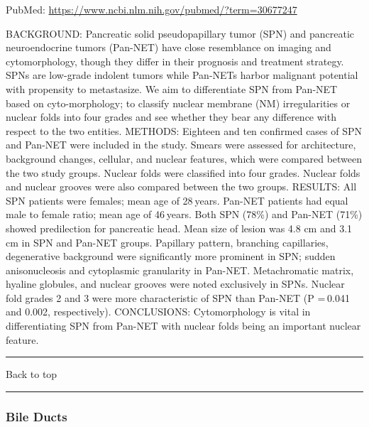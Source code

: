 \documentclass[]{article}
\begin{document}
PubMed: \url{https://www.ncbi.nlm.nih.gov/pubmed/?term=30677247}

BACKGROUND: Pancreatic solid pseudopapillary tumor (SPN) and pancreatic
neuroendocrine tumors (Pan-NET) have close resemblance on imaging and
cytomorphology, though they differ in their prognosis and treatment
strategy. SPNs are low-grade indolent tumors while Pan-NETs harbor
malignant potential with propensity to metastasize. We aim to
differentiate SPN from Pan-NET based on cyto-morphology; to classify
nuclear membrane (NM) irregularities or nuclear folds into four grades
and see whether they bear any difference with respect to the two
entities. METHODS: Eighteen and ten confirmed cases of SPN and Pan-NET
were included in the study. Smears were assessed for architecture,
background changes, cellular, and nuclear features, which were compared
between the two study groups. Nuclear folds were classified into four
grades. Nuclear folds and nuclear grooves were also compared between the
two groups. RESULTS: All SPN patients were females; mean age of
28 years. Pan-NET patients had equal male to female ratio; mean age of
46 years. Both SPN (78\%) and Pan-NET (71\%) showed predilection for
pancreatic head. Mean size of lesion was 4.8 cm and 3.1 cm in SPN and
Pan-NET groups. Papillary pattern, branching capillaries, degenerative
background were significantly more prominent in SPN; sudden
anisonucleosis and cytoplasmic granularity in Pan-NET. Metachromatic
matrix, hyaline globules, and nuclear grooves were noted exclusively in
SPNs. Nuclear fold grades 2 and 3 were more characteristic of SPN than
Pan-NET (P = 0.041 and 0.002, respectively). CONCLUSIONS: Cytomorphology
is vital in differentiating SPN from Pan-NET with nuclear folds being an
important nuclear feature.

{}

{}

\begin{center}\rule{0.5\linewidth}{\linethickness}\end{center}

Back to top

\begin{center}\rule{0.5\linewidth}{\linethickness}\end{center}

\pagebreak

\hypertarget{bile-ducts-1}{%
\subsubsection{Bile Ducts}\label{bile-ducts-1}}
\end{document}
